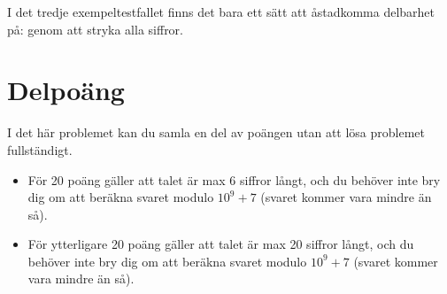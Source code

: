 I det tredje exempeltestfallet finns det bara ett sätt att åstadkomma delbarhet på: genom att stryka alla siffror.

\section*{Delpoäng}
I det här problemet kan du samla en del av poängen utan att lösa problemet fullständigt.

\begin{itemize}
    \item För 20 poäng gäller att talet är max 6 siffror långt, och du behöver inte bry dig om att beräkna svaret modulo $10^9 + 7$ (svaret kommer vara mindre än så).
    \item För ytterligare 20 poäng gäller att talet är max 20 siffror långt, och du behöver inte bry dig om att beräkna svaret modulo $10^9 + 7$ (svaret kommer vara mindre än så).
\end{itemize}
